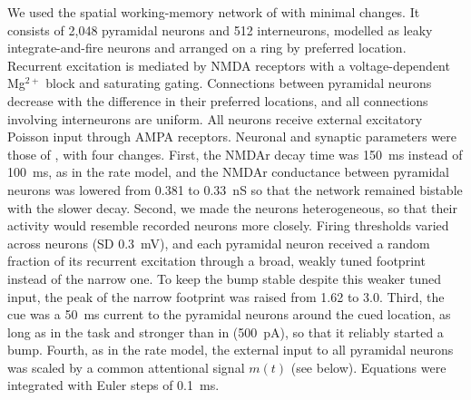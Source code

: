 \documentclass[11pt]{article}
\begin{document}
We used the spatial working-memory network of \citet{compte2000} with minimal changes. It consists of 2,048 pyramidal neurons and 512 interneurons, modelled as leaky integrate-and-fire neurons and arranged on a ring by preferred location. Recurrent excitation is mediated by NMDA receptors with a voltage-dependent Mg$^{2+}$ block and saturating gating. Connections between pyramidal neurons decrease with the difference in their preferred locations, and all connections involving interneurons are uniform. All neurons receive external excitatory Poisson input through AMPA receptors. Neuronal and synaptic parameters were those of \citet{compte2000}, with four changes. First, the NMDAr decay time was 150~ms instead of 100~ms, as in the rate model, and the NMDAr conductance between pyramidal neurons was lowered from 0.381 to 0.33~nS so that the network remained bistable with the slower decay. Second, we made the neurons heterogeneous, so that their activity would resemble recorded neurons more closely. Firing thresholds varied across neurons (SD 0.3~mV), and each pyramidal neuron received a random fraction of its recurrent excitation through a broad, weakly tuned footprint instead of the narrow one. To keep the bump stable despite this weaker tuned input, the peak of the narrow footprint was raised from 1.62 to 3.0. Third, the cue was a 50~ms current to the pyramidal neurons around the cued location, as long as in the task and stronger than in \citet{compte2000} (500~pA), so that it reliably started a bump. Fourth, as in the rate model, the external input to all pyramidal neurons was scaled by a common attentional signal $m(t)$ (see below). Equations were integrated with Euler steps of 0.1~ms.
\end{document}
